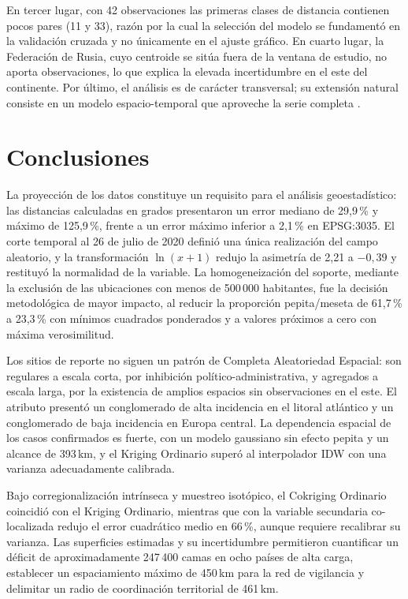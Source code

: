 \documentclass[12pt,a4paper]{article}
\begin{document}
En tercer lugar, con 42 observaciones las primeras clases de distancia contienen pocos pares (11 y 33), razón por la cual la selección del modelo se fundamentó en la validación cruzada y no únicamente en el ajuste gráfico. En cuarto lugar, la Federación de Rusia, cuyo centroide se sitúa fuera de la ventana de estudio, no aporta observaciones, lo que explica la elevada incertidumbre en el este del continente. Por último, el análisis es de carácter transversal; su extensión natural consiste en un modelo espacio-temporal que aproveche la serie completa \citep{cressie2011}.

\section{Conclusiones}

La proyección de los datos constituye un requisito para el análisis geoestadístico: las distancias calculadas en grados presentaron un error mediano de 29,9\,\% y máximo de 125,9\,\%, frente a un error máximo inferior a 2,1\,\% en EPSG:3035. El corte temporal al 26 de julio de 2020 definió una única realización del campo aleatorio, y la transformación $\ln(x+1)$ redujo la asimetría de 2,21 a $-0{,}39$ y restituyó la normalidad de la variable. La homogeneización del soporte, mediante la exclusión de las ubicaciones con menos de 500\,000 habitantes, fue la decisión metodológica de mayor impacto, al reducir la proporción pepita/meseta de 61,7\,\% a 23,3\,\% con mínimos cuadrados ponderados y a valores próximos a cero con máxima verosimilitud.

Los sitios de reporte no siguen un patrón de Completa Aleatoriedad Espacial: son regulares a escala corta, por inhibición político-administrativa, y agregados a escala larga, por la existencia de amplios espacios sin observaciones en el este. El atributo presentó un conglomerado de alta incidencia en el litoral atlántico y un conglomerado de baja incidencia en Europa central. La dependencia espacial de los casos confirmados es fuerte, con un modelo gaussiano sin efecto pepita y un alcance de 393\,km, y el Kriging Ordinario superó al interpolador IDW con una varianza adecuadamente calibrada.

Bajo corregionalización intrínseca y muestreo isotópico, el Cokriging Ordinario coincidió con el Kriging Ordinario, mientras que con la variable secundaria co-localizada redujo el error cuadrático medio en 66\,\%, aunque requiere recalibrar su varianza. Las superficies estimadas y su incertidumbre permitieron cuantificar un déficit de aproximadamente 247\,400 camas en ocho países de alta carga, establecer un espaciamiento máximo de 450\,km para la red de vigilancia y delimitar un radio de coordinación territorial de 461\,km.
\end{document}
